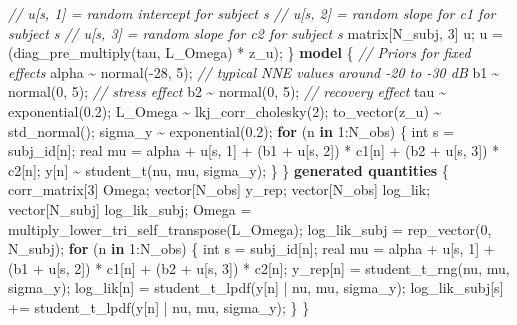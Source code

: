 \documentclass[
  english,
  man,floatsintext]{apa6}
\newenvironment{Shaded}{\begin{snugshade}}{\end{snugshade}}
\newcommand{\CommentTok}[1]{\textcolor[rgb]{0.56,0.35,0.01}{\textit{#1}}}
\newcommand{\ControlFlowTok}[1]{\textcolor[rgb]{0.13,0.29,0.53}{\textbf{#1}}}
\newcommand{\DataTypeTok}[1]{\textcolor[rgb]{0.13,0.29,0.53}{#1}}
\newcommand{\DecValTok}[1]{\textcolor[rgb]{0.00,0.00,0.81}{#1}}
\newcommand{\FloatTok}[1]{\textcolor[rgb]{0.00,0.00,0.81}{#1}}
\newcommand{\KeywordTok}[1]{\textcolor[rgb]{0.13,0.29,0.53}{\textbf{#1}}}
\newcommand{\NormalTok}[1]{#1}
\begin{document}
\begin{Shaded}
\begin{Highlighting}[]
  \CommentTok{// u[s, 1] = random intercept for subject s}
  \CommentTok{// u[s, 2] = random slope for c1 for subject s}
  \CommentTok{// u[s, 3] = random slope for c2 for subject s}
  \DataTypeTok{matrix}\NormalTok{[N\_subj, }\DecValTok{3}\NormalTok{] u;}
\NormalTok{  u = (diag\_pre\_multiply(tau, L\_Omega) * z\_u)\textquotesingle{};}
\NormalTok{\}}
\KeywordTok{model}\NormalTok{ \{}
  \CommentTok{// Priors for fixed effects}
\NormalTok{  alpha \textasciitilde{} normal({-}}\DecValTok{28}\NormalTok{, }\DecValTok{5}\NormalTok{);  }\CommentTok{// typical NNE values around {-}20 to {-}30 dB}
\NormalTok{  b1 \textasciitilde{} normal(}\DecValTok{0}\NormalTok{, }\DecValTok{5}\NormalTok{);       }\CommentTok{// stress effect}
\NormalTok{  b2 \textasciitilde{} normal(}\DecValTok{0}\NormalTok{, }\DecValTok{5}\NormalTok{);       }\CommentTok{// recovery effect}
\NormalTok{  tau \textasciitilde{} exponential(}\FloatTok{0.2}\NormalTok{);}
\NormalTok{  L\_Omega \textasciitilde{} lkj\_corr\_cholesky(}\DecValTok{2}\NormalTok{);}
\NormalTok{  to\_vector(z\_u) \textasciitilde{} std\_normal();}
\NormalTok{  sigma\_y \textasciitilde{} exponential(}\FloatTok{0.2}\NormalTok{);}
  \ControlFlowTok{for}\NormalTok{ (n }\ControlFlowTok{in} \DecValTok{1}\NormalTok{:N\_obs) \{}
    \DataTypeTok{int}\NormalTok{ s = subj\_id[n];}
    \DataTypeTok{real}\NormalTok{ mu = alpha + u[s, }\DecValTok{1}\NormalTok{]}
\NormalTok{            + (b1 + u[s, }\DecValTok{2}\NormalTok{]) * c1[n]}
\NormalTok{            + (b2 + u[s, }\DecValTok{3}\NormalTok{]) * c2[n];}
\NormalTok{    y[n] \textasciitilde{} student\_t(nu, mu, sigma\_y);}
\NormalTok{  \}}
\NormalTok{\}}
\KeywordTok{generated quantities}\NormalTok{ \{}
  \DataTypeTok{corr\_matrix}\NormalTok{[}\DecValTok{3}\NormalTok{] Omega;}
  \DataTypeTok{vector}\NormalTok{[N\_obs] y\_rep;}
  \DataTypeTok{vector}\NormalTok{[N\_obs] log\_lik;}
  \DataTypeTok{vector}\NormalTok{[N\_subj] log\_lik\_subj;}
\NormalTok{  Omega = multiply\_lower\_tri\_self\_transpose(L\_Omega);}
\NormalTok{  log\_lik\_subj = rep\_vector(}\DecValTok{0}\NormalTok{, N\_subj);}
  \ControlFlowTok{for}\NormalTok{ (n }\ControlFlowTok{in} \DecValTok{1}\NormalTok{:N\_obs) \{}
    \DataTypeTok{int}\NormalTok{ s = subj\_id[n];}
    \DataTypeTok{real}\NormalTok{ mu = alpha + u[s, }\DecValTok{1}\NormalTok{]}
\NormalTok{            + (b1 + u[s, }\DecValTok{2}\NormalTok{]) * c1[n]}
\NormalTok{            + (b2 + u[s, }\DecValTok{3}\NormalTok{]) * c2[n];}
\NormalTok{    y\_rep[n] = student\_t\_rng(nu, mu, sigma\_y);}
\NormalTok{    log\_lik[n] = student\_t\_lpdf(y[n] | nu, mu, sigma\_y);}
\NormalTok{    log\_lik\_subj[s] += student\_t\_lpdf(y[n] | nu, mu, sigma\_y);}
\NormalTok{  \}}
\NormalTok{\}}
\end{Highlighting}
\end{Shaded}
\end{document}
